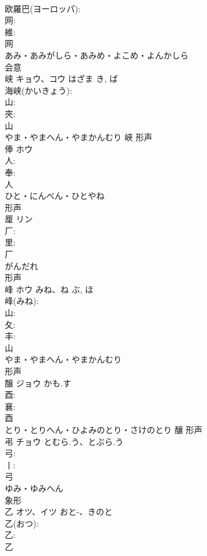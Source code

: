 \documentclass[8pt]{extreport}
\begin{document}
\begin{CJK}{UTF8}{min}
\\	欧羅巴(ヨーロッパ): 
\\	网: 
\\	維: 
\\	网	
\\	あみ・あみがしら・あみめ・よこめ・よんかしら	
\\	会意 
\\	峡	キョウ、コウ	はざま	き, ば	
\\	海峡(かいきょう): 
\\	山: 
\\	夾: 
\\	山	
\\	やま・やまへん・やまかんむり	峽	形声 
\\	俸	ホウ			
\\	人: 
\\	奉: 
\\	人	
\\	ひと・にんべん・ひとやね	
\\	形声 
\\	厘	リン			
\\	厂: 
\\	里: 
\\	厂	
\\	がんだれ	
\\	形声 
\\	峰	ホウ	みね、ね	ぶ, ほ	
\\	峰(みね): 
\\	山: 
\\	夂: 
\\	丰: 
\\	山	
\\	やま・やまへん・やまかんむり	
\\	形声 
\\	醸	ジョウ	かも.す		
\\	酉: 
\\	襄: 
\\	酉	
\\	とり・とりへん・ひよみのとり・さけのとり	釀	形声 
\\	弔	チョウ	とむら.う、とぶら.う		
\\	弓: 
\\	丨: 
\\	弓	
\\	ゆみ・ゆみへん	
\\	象形 
\\	乙	オツ、イツ	おと-、きのと		
\\	乙(おつ): 
\\	乙: 
\\	乙	

\end{CJK}
\end{document}
